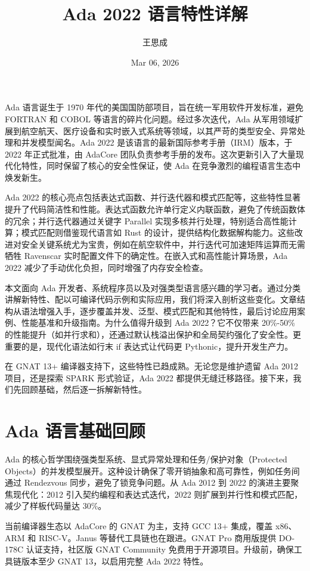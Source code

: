 \title{Ada 2022 语言特性详解}
\author{王思成}
\date{Mar 06, 2026}
\maketitle
Ada 语言诞生于 1970 年代的美国国防部项目，旨在统一军用软件开发标准，避免 FORTRAN 和 COBOL 等语言的碎片化问题。经过多次迭代，Ada 从军用领域扩展到航空航天、医疗设备和实时嵌入式系统等领域，以其严苛的类型安全、异常处理和并发模型闻名。Ada 2022 是该语言的最新国际参考手册（IRM）版本，于 2022 年正式批准，由 AdaCore 团队负责参考手册的发布。这次更新引入了大量现代化特性，同时保留了核心的安全性保证，使 Ada 在竞争激烈的编程语言生态中焕发新生。\par
Ada 2022 的核心亮点包括表达式函数、并行迭代器和模式匹配等，这些特性显著提升了代码简洁性和性能。表达式函数允许单行定义内联函数，避免了传统函数体的冗余；并行迭代器通过关键字 Parallel 实现多核并行处理，特别适合高性能计算；模式匹配则借鉴现代语言如 Rust 的设计，提供结构化数据解构能力。这些改进对安全关键系统尤为宝贵，例如在航空软件中，并行迭代可加速矩阵运算而无需牺牲 Ravenscar 实时配置文件下的确定性。在嵌入式和高性能计算场景，Ada 2022 减少了手动优化负担，同时增强了内存安全检查。\par
本文面向 Ada 开发者、系统程序员以及对强类型语言感兴趣的学习者。通过分类讲解新特性、配以可编译代码示例和实际应用，我们将深入剖析这些变化。文章结构从语法增强入手，逐步覆盖并发、泛型、模式匹配和其他特性，最后讨论应用案例、性能基准和升级指南。为什么值得升级到 Ada 2022？它不仅带来 20\%{}-50\%{} 的性能提升（如并行求和），还通过默认栈溢出保护和全局契约强化了安全性。更重要的是，现代化语法如行末 if 表达式让代码更 Pythonic，提升开发生产力。\par
在 GNAT 13+ 编译器支持下，这些特性已趋成熟。无论您是维护遗留 Ada 2012 项目，还是探索 SPARK 形式验证，Ada 2022 都提供无缝迁移路径。接下来，我们先回顾基础，然后逐一拆解新特性。\par
\chapter{Ada 语言基础回顾}
Ada 的核心哲学围绕强类型系统、显式异常处理和任务/保护对象（Protected Objects）的并发模型展开。这种设计确保了零开销抽象和高可靠性，例如任务间通过 Rendezvous 同步，避免了锁竞争问题。从 Ada 2012 到 2022 的演进主要聚焦现代化：2012 引入契约编程和表达式迭代，2022 则扩展到并行性和模式匹配，减少了样板代码量达 30\%{}。\par
当前编译器生态以 AdaCore 的 GNAT 为主，支持 GCC 13+ 集成，覆盖 x86、ARM 和 RISC-V。Janus 等替代工具链也在跟进。GNAT Pro 商用版提供 DO-178C 认证支持，社区版 GNAT Community 免费用于开源项目。升级前，确保工具链版本至少 GNAT 13，以启用完整 Ada 2022 特性。\par
